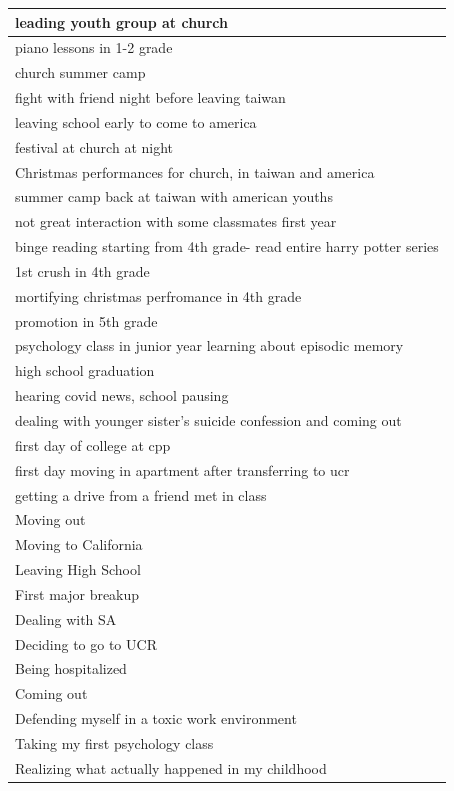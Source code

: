 \documentclass[
  .7em,
  letterpaper,
  DIV=11,
  numbers=noendperiod]{scrartcl}
\begin{document}
\begin{table}
\begin{tabular}{l}
\hline
leading youth group at church\\
\hline
piano lessons in 1-2 grade\\
\hline
church summer camp\\
\hline
fight with friend night before leaving taiwan\\
\hline
leaving school early to come to america\\
\hline
festival at church at night\\
\hline
Christmas performances for church, in taiwan and america\\
\hline
summer camp back at taiwan with american youths\\
\hline
not great interaction with some classmates first year\\
\hline
binge reading starting from 4th grade- read entire harry potter series\\
\hline
1st crush in 4th grade\\
\hline
mortifying christmas perfromance in 4th grade\\
\hline
promotion in 5th grade\\
\hline
psychology class in junior year learning about episodic memory\\
\hline
high school graduation\\
\hline
hearing covid news, school pausing\\
\hline
dealing with younger sister's suicide confession and coming out\\
\hline
first day of college at cpp\\
\hline
first day moving in apartment after transferring to ucr\\
\hline
getting a drive from a friend met in class\\
\hline
Moving out\\
\hline
Moving to California\\
\hline
Leaving High School\\
\hline
First major breakup\\
\hline
Dealing with SA\\
\hline
Deciding to go to UCR\\
\hline
Being hospitalized\\
\hline
Coming out\\
\hline
Defending myself in a toxic work environment\\
\hline
Taking my first psychology class\\
\hline
Realizing what actually happened in my childhood\\

\end{tabular}
\end{table}
\end{document}
